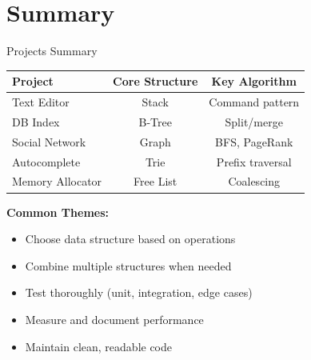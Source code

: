 \documentclass[aspectratio=169,xcolor=dvipsnames]{beamer}
\begin{document}
\section{Summary}

\begin{frame}{Projects Summary}
  \begin{table}
    \centering
    \small
    \begin{tabular}{lcc}
      \hline
      \textbf{Project} & \textbf{Core Structure} & \textbf{Key Algorithm} \\
      \hline
      Text Editor & Stack & Command pattern \\
      DB Index & B-Tree & Split/merge \\
      Social Network & Graph & BFS, PageRank \\
      Autocomplete & Trie & Prefix traversal \\
      Memory Allocator & Free List & Coalescing \\
      \hline
    \end{tabular}
  \end{table}

  \vspace{0.3cm}
  \textbf{Common Themes:}
  \begin{itemize}
    \item Choose data structure based on operations
    \item Combine multiple structures when needed
    \item Test thoroughly (unit, integration, edge cases)
    \item Measure and document performance
    \item Maintain clean, readable code
  \end{itemize}
\end{frame}
\end{document}
